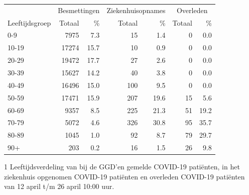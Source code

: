 \documentclass[
  english,
  man,floatsintext]{apa6}
\begin{document}
\begin{table}
\centering\begingroup\fontsize{11}{13}\selectfont

\begin{threeparttable}
\begin{tabular}{lrrrrrr}
\toprule
\multicolumn{1}{c}{ } & \multicolumn{2}{c}{Besmettingen} & \multicolumn{2}{c}{Ziekenhuisopnames} & \multicolumn{2}{c}{Overleden} \\
\cmidrule(l{3pt}r{3pt}){2-3} \cmidrule(l{3pt}r{3pt}){4-5} \cmidrule(l{3pt}r{3pt}){6-7}
Leeftijdsgroep & Totaal & \% & Totaal & \% & Totaal & \%\\
\midrule
0-9 & 7975 & 7.3 & 15 & 1.4 & 0 & 0.0\\
10-19 & 17274 & 15.7 & 10 & 0.9 & 0 & 0.0\\
20-29 & 19472 & 17.7 & 27 & 2.6 & 0 & 0.0\\
30-39 & 15627 & 14.2 & 40 & 3.8 & 0 & 0.0\\
40-49 & 16496 & 15.0 & 100 & 9.5 & 0 & 0.0\\
50-59 & 17471 & 15.9 & 207 & 19.6 & 15 & 5.6\\
60-69 & 9357 & 8.5 & 225 & 21.3 & 51 & 19.2\\
70-79 & 5072 & 4.6 & 326 & 30.8 & 95 & 35.7\\
80-89 & 1045 & 1.0 & 92 & 8.7 & 79 & 29.7\\
90+ & 203 & 0.2 & 16 & 1.5 & 26 & 9.8\\
\bottomrule
\end{tabular}
\begin{tablenotes}
\item[1] Leeftijdsverdeling van bij de GGD’en gemelde COVID-19 patiënten, in het ziekenhuis opgenomen COVID-19 patiënten en overleden COVID-19 patiënten van 12 april t/m 26 april 10:00 uur.
\end{tablenotes}
\end{threeparttable}
\endgroup{}
\end{table}

\newpage
\end{document}
